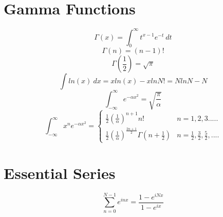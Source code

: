 \documentclass[fleqn, 14pt]{extarticle} %
\begin{document}
\section{Gamma Functions}
\begin{equation}
	\Gamma(x)=\int_{0}^{\infty}t^{x-1}e^{-t} \ dt
\end{equation}
\begin{equation}
	\Gamma(n)=(n-1)!
\end{equation}
\begin{equation}
	\Gamma(\frac{1}{2})=\sqrt{\pi}
\end{equation}
\begin{equation}
	\int ln(x)\ dx =xln(x)-x 
	ln N! =N ln N -N 
\end{equation}
\begin{equation}
	\int_{-\infty}^{\infty} e^{-\alpha x^2}=\sqrt{\frac{\pi}{\alpha}}
\end{equation}
\begin{equation}
	\int_{-\infty}^{\infty} x^n e^{-\alpha x^2} = \begin{cases}
		\frac{1}{2}(\frac{1}{\alpha})^{n+1} n! & n=1,2,3..... \\
		\frac{1}{2} (\frac{1}{\alpha})^{\frac{2n+1}{2}} \Gamma(n+\frac{1}{2}) & n= \frac{1}{2},\frac{3}{2},\frac{5}{2},....
	\end{cases}
\end{equation}
\section{Essential Series }
\begin{equation}
	\sum_{n=0}^{N-1}e^{i n x}=\frac{1-e^{iNx}}{1-e^{ix}} 
\end{equation}
\end{document}
